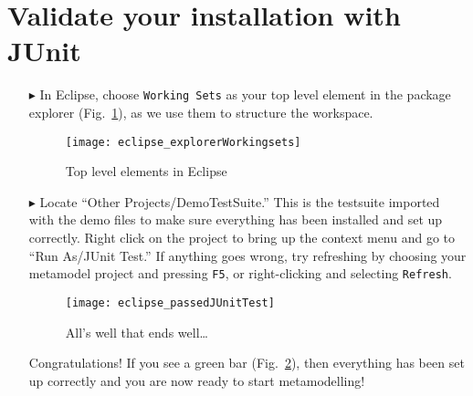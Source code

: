 \newpage
\genHeader
\hypertarget{validate common}{} 
\section{Validate your installation with JUnit}

\begin{itemize}

\item[$\blacktriangleright$] In Eclipse, choose \texttt{Working Sets} as your top level element in the package explorer (Fig.~\ref{eclipse:topLevel}), as we use
them to structure the workspace.

\begin{figure}[htbp]
	\centering
  \texttt{[image: eclipse\_explorerWorkingsets]}
	\caption{Top level elements in Eclipse}
	\label{eclipse:topLevel}
\end{figure}

\item[$\blacktriangleright$] Locate ``Other Projects/DemoTestSuite.'' This is the testsuite imported with the demo files to make sure everything has been installed and
set up correctly. Right click on the project to bring up the context menu and go to ``Run As/JUnit Test.'' If anything goes wrong, try refreshing by choosing
your metamodel project and pressing  \texttt{F5}, or right-clicking and selecting \texttt{Refresh}.

\vspace{0.5cm}

\begin{figure}[htbp]
	\centering
  \texttt{[image: eclipse\_passedJUnitTest]}
	\caption{All's well that ends well\ldots}
	\label{eclipse:passedTest}
\end{figure}

\vspace{0.5cm}

Congratulations!  If you see a green bar  (Fig.~\ref{eclipse:passedTest}), then everything has been set up correctly and you are now ready to start
metamodelling!


\end{itemize}